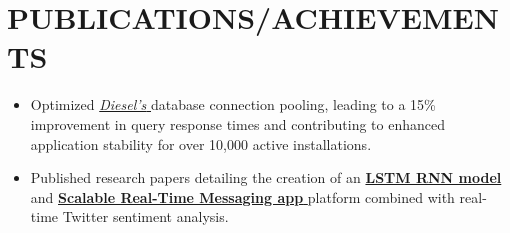 \documentclass[letterpaper,10pt]{article}
\newcommand{\resumeItem}[1]{
  \item\small{
    {#1 \vspace{-2pt}}
  }
}
\newcommand{\resumeItemListStart}{\begin{itemize}}
\newcommand{\resumeItemListEnd}{\end{itemize}\vspace{-5pt}}
\begin{document}
\section{PUBLICATIONS/ACHIEVEMENTS}
\resumeItemListStart
\resumeItem{\normalsize{Optimized \href{https://github.com/diesel-rs/diesel}{\textit{Diesel's \raisebox{-0.1\height}\faExternalLink}}} database connection pooling, leading to a 15\% improvement in query response times and contributing to enhanced application stability for over 10,000 active installations.}
  \vspace{-4pt}
  \resumeItem{\normalsize{Published research papers detailing the creation of an \href{https://www.researchgate.net/publication/369430263_Stock_Market_Trend_Prediction_Along_with_Twitter_Sentiment_Analysis}{\textbf{LSTM RNN model \raisebox{-0.1\height}\faExternalLink}} and \href{https://www.ijraset.com/fileserve.php?FID=35305}{\textbf{Scalable Real-Time Messaging app \raisebox{-0.1\height}\faExternalLink}} platform combined with real-time Twitter sentiment analysis.}}
  \vspace{-4pt}
\resumeItemListEnd
\end{document}

